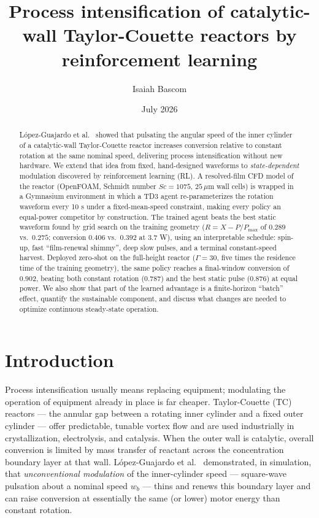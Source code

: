 \documentclass{article}
\title{Process intensification of catalytic-wall Taylor-Couette reactors by reinforcement learning}
\author{Isaiah Bascom}
\date{July 2026}
\begin{document}
\maketitle

\begin{abstract}
L\'opez-Guajardo et al.~\cite{lopez2024process} showed that pulsating the angular
speed of the inner cylinder of a catalytic-wall Taylor-Couette reactor increases
conversion relative to constant rotation at the same nominal speed, delivering
process intensification without new hardware. We extend that idea from fixed,
hand-designed waveforms to \emph{state-dependent} modulation discovered by
reinforcement learning (RL). A resolved-film CFD model of the reactor
(OpenFOAM, Schmidt number $Sc = 1075$, $25\,\mu$m wall cells) is wrapped in a
Gymnasium environment in which a TD3 agent re-parameterizes the rotation
waveform every 10 s under a fixed-mean-speed constraint, making every policy an
equal-power competitor by construction. The trained agent beats the best static
waveform found by grid search on the training geometry ($R = X - P/P_{\max}$ of
$0.289$ vs.\ $0.275$; conversion $0.406$ vs.\ $0.392$ at $3.7$ W), using an
interpretable schedule: spin-up, fast ``film-renewal shimmy'', deep slow
pulses, and a terminal constant-speed harvest. Deployed zero-shot on the
full-height reactor ($\Gamma = 30$, five times the residence time of the
training geometry), the same policy reaches a final-window conversion of
$0.902$, beating both constant rotation ($0.787$) and the best static pulse
($0.876$) at equal power. We also show that part of the learned advantage is a
finite-horizon ``batch'' effect, quantify the sustainable component, and
discuss what changes are needed to optimize continuous steady-state operation.
\end{abstract}

\section{Introduction}
Process intensification usually means replacing equipment; modulating the
operation of equipment already in place is far cheaper. Taylor-Couette (TC)
reactors --- the annular gap between a rotating inner cylinder and a fixed
outer cylinder --- offer predictable, tunable vortex flow and are used
industrially in crystallization, electrolysis, and catalysis. When the outer
wall is catalytic, overall conversion is limited by mass transfer of reactant
across the concentration boundary layer at that wall. L\'opez-Guajardo et
al.~\cite{lopez2024process} demonstrated, in simulation, that
\emph{unconventional modulation} of the inner-cylinder speed --- square-wave
pulsation about a nominal speed $w_b$ --- thins and renews this boundary layer
and can raise conversion at essentially the same (or lower) motor energy than
constant rotation.
\end{document}
